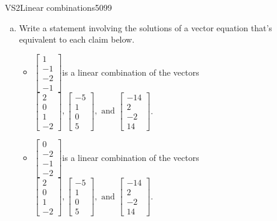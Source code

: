 \begin{exercise}{VS2}{Linear combinations}{5099} 
\begin{exerciseStatement} 

\begin{enumerate}[(a)]
\item  

 Write a statement involving the solutions of a vector equation that's equivalent to each claim below. 

 

\begin{itemize}
\item  

 \(\left[\begin{array}{c}
1 \\
-1 \\
-2 \\
-1
\end{array}\right]\)is a linear combination of the vectors \(\left[\begin{array}{c}
2 \\
0 \\
1 \\
-2
\end{array}\right] , \left[\begin{array}{c}
-5 \\
1 \\
0 \\
5
\end{array}\right] , \text{ and } \left[\begin{array}{c}
-14 \\
2 \\
-2 \\
14
\end{array}\right]\). 

 
\item  

 \(\left[\begin{array}{c}
0 \\
-2 \\
-1 \\
-2
\end{array}\right]\)is a linear combination of the vectors \(\left[\begin{array}{c}
2 \\
0 \\
1 \\
-2
\end{array}\right] , \left[\begin{array}{c}
-5 \\
1 \\
0 \\
5
\end{array}\right] , \text{ and } \left[\begin{array}{c}
-14 \\
2 \\
-2 \\
14
\end{array}\right]\). 


\end{itemize}
\end{enumerate}
\end{exerciseStatement}
\end{exercise}
